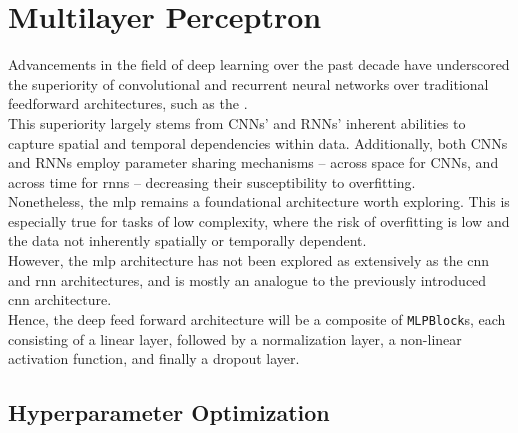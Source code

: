 \section{Multilayer Perceptron}
\label{sec:mlp}

Advancements in the field of deep learning over the past decade have underscored the superiority of convolutional
and recurrent neural networks over traditional feedforward architectures, such as the .\\
This superiority largely stems from CNNs' and RNNs' inherent abilities to capture spatial and temporal dependencies within
data.
Additionally, both CNNs and RNNs employ parameter sharing mechanisms -- across space for CNNs, and across time for \glspl{rnn}
-- decreasing their susceptibility to overfitting.\\

Nonetheless, the \gls{mlp} remains a foundational architecture worth exploring. This is especially true for tasks of low
complexity, where the risk of overfitting is low and the data not inherently spatially or temporally dependent.\\
However, the \gls{mlp} architecture has not been explored as extensively as the \gls{cnn} and \gls{rnn} architectures, and
is mostly an analogue to the previously introduced \gls{cnn} architecture.\\
Hence, the deep feed forward architecture will be a composite of \texttt{MLPBlock}s, each consisting of a linear layer,
followed by a normalization layer, a non-linear activation function, and finally a dropout layer. \\

\subsection{Hyperparameter Optimization}


